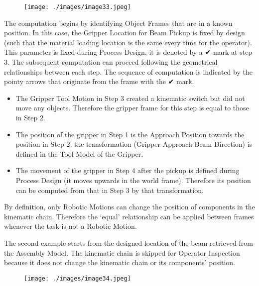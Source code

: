 \begin{figure}[H]
\texttt{[image: ./images/image33.jpeg]}
\end{figure}


The computation begins by identifying Object Frames that are in a known position. In this case, the Gripper Location for Beam Pickup is fixed by design (such that the material loading location is the same every time for the operator). This parameter is fixed during Process Design, it is denoted by a ✔ mark at step 3. The subsequent computation can proceed following the geometrical relationships between each step. The sequence of computation is indicated by the pointy arrows that originate from the frame with the ✔ mark. 

\begin{itemize}
	\item The Gripper Tool Motion in Step 3 created a kinematic switch but did not move any objects. Therefore the gripper frame for this step is equal to those in Step 2.

	\item The position of the gripper in Step 1 is the Approach Position towards the position in Step 2, the transformation (Gripper-Approach-Beam Direction) is defined in the Tool Model of the Gripper.

	\item The movement of the gripper in Step 4 after the pickup is defined during Process Design (it moves upwards in the world frame). Therefore its position can be computed from that in Step 3 by that transformation. 

\end{itemize}
By definition, only Robotic Motions can change the position of components in the kinematic chain. Therefore the ‘equal’ relationship can be applied between frames whenever the task is not a Robotic Motion.


The second example starts from the designed location of the beam retrieved from the Assembly Model. The kinematic chain is skipped for Operator Inspection because it does not change the kinematic chain or its components’ position.

\begin{figure}[H]
\texttt{[image: ./images/image34.jpeg]}
\end{figure}




